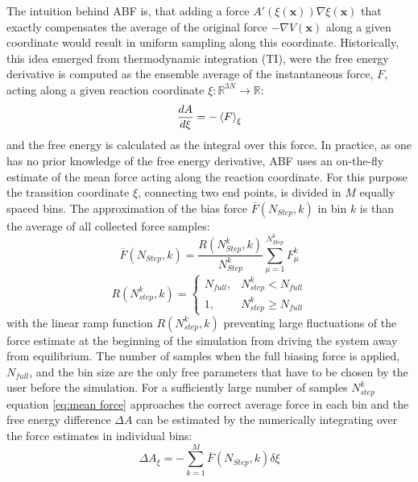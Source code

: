 The intuition behind ABF is, that adding a force $A'(\xi(\textbf{x}))\nabla \xi(\textbf{x})$ that exactly compensates the average of the original force $-\nabla V(\textbf{x})$ along a given coordinate would result in uniform sampling along this coordinate.\autocite{comer2015adaptive}
Historically, this idea emerged from thermodynamic integration (TI), were the free energy derivative  is computed as the ensemble average of the instantaneous force, $F$, acting along a given reaction coordinate $\xi: \mathbb{R} ^{3N} \to \mathbb{R}$:
\begin{equation}
\frac{dA}{d\xi} = -\braket{F}_{\xi}
\end{equation}
and the free energy is calculated as the integral over this force.\autocite{kirkwood1935statistical,zwanzig1954high}
In practice, as one has no prior knowledge of the free energy derivative, ABF uses an on-the-fly estimate of the mean force acting along the reaction coordinate. For this purpose the transition coordinate $\xi$, connecting two end points, is divided in $M$ equally spaced bins. The approximation of the bias force $\overline{F}(N_{Step},k)$ in bin $k$ is than the average of all collected force samples:\autocite{comer2015adaptive}
\begin{equation}
  \overline{F}(N_{Step},k) = \frac{R(N_{Step}^k,k)}{N_{Step}^{k}} \sum_{\mu=1}^{N_{Step}^{k}} F_{\mu}^{k}
  \label{eq:mean force}
\end{equation}
\begin{equation}
  R(N_{step}^k,k)=\left\{\begin{array}{ll} N_{full}, & N_{step}^{k} < N_{full} \\
                                         1,  & N_{step}^{k} \geq  N_{full} \end{array}\right. \label{eq:ramp}
\end{equation}
with the linear ramp function $R(N_{step}^k,k)$ preventing large fluctuations of the force estimate at the beginning of the simulation from driving the system away from equilibrium. The number of samples when the full biasing force is applied, $N_{full}$, and the bin size are the only free parameters that have to be chosen by the user before the simulation. For a sufficiently large number of samples $N_{step}^k$ equation \ref{eq:mean force} approaches the correct average force in each bin and the free energy difference $\Delta A$ can be estimated by the numerically integrating over the force estimates in individual bins:\autocite{comer2015adaptive}
\begin{equation}
  \Delta A_{\xi} = - \sum_{k=1}^{M} \overline{F}(N_{Step},k) \delta \xi
\end{equation}

